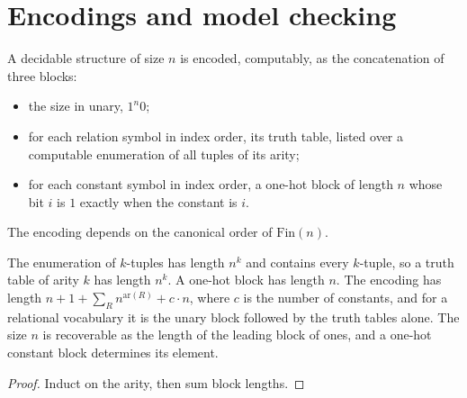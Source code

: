 \section{Encodings and model checking}

\begin{definition}
  \label{def:desc-encoding}
  \leanok
  A decidable structure of size $n$ is encoded, computably, as the concatenation
  of three blocks:
  \begin{itemize}
    \item the size in unary, $1^n 0$;
    \item for each relation symbol in index order, its truth table, listed over a
      computable enumeration of all tuples of its arity;
    \item for each constant symbol in index order, a one-hot block of length $n$
      whose bit $i$ is $1$ exactly when the constant is $i$.
  \end{itemize}
  The encoding depends on the canonical order of $\mathrm{Fin}(n)$.
\end{definition}

\begin{proposition}
  \label{prop:desc-encoding-length}
  \leanok
  The enumeration of $k$-tuples has length $n^k$ and contains every $k$-tuple,
  so a truth table of arity $k$ has length $n^k$. A one-hot block has length
  $n$. The encoding has length
  $n + 1 + \sum_R n^{\mathrm{ar}(R)} + c \cdot n$, where $c$ is the number of
  constants, and for a relational vocabulary it is the unary block followed by
  the truth tables alone. The size $n$ is recoverable as the length of the
  leading block of ones, and a one-hot constant block determines its element.
\end{proposition}
\begin{proof}
  \leanok
  Induct on the arity, then sum block lengths.
\end{proof}

